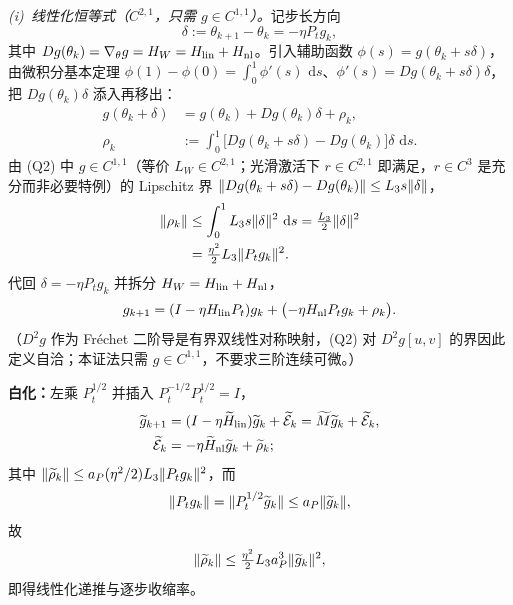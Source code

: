 \documentclass[fontset=windows,11pt]{ctexart}
\DeclarePairedDelimiter{\norm}{\lVert}{\rVert}
\newcommand{\W}{W}
\newcommand{\Erem}{\mathcal E}
\newcommand{\wt}[1]{\widetilde{#1}}
\newcommand{\dd}{\,\mathrm d}
\numberwithin{equation}{section}
\begin{document}
\medskip
\emph{(i)~线性化恒等式（$C^{2,1}$，只需 $g\in C^{1,1}$）。}记步长方向
\begin{equation}
\delta:=\theta_{k+1}-\theta_k=-\eta P_tg_k,
\end{equation}
其中 $Dg(\theta_k)=\nabla_\theta g=H_{\W}=H_{\rm lin}+H_{\rm nl}$。引入辅助函数 $\phi(s)=g(\theta_k+s\delta)$，由微积分基本定理 $\phi(1)-\phi(0)=\int_0^1\phi'(s)\,\dd s$、$\phi'(s)=Dg(\theta_k+s\delta)\delta$，把 $Dg(\theta_k)\delta$ 添入再移出：
\begin{align}
g(\theta_k+\delta)&=g(\theta_k)+Dg(\theta_k)\delta+\rho_k,\\
\rho_k&:=\int_0^1\bigl[Dg(\theta_k+s\delta)-Dg(\theta_k)\bigr]\delta\,\dd s.
\end{align}
由 (Q2) 中 $g\in C^{1,1}$（等价 $L_{\W}\in C^{2,1}$；光滑激活下 $r\in C^{2,1}$ 即满足，$r\in C^3$ 是充分而非必要特例）的 Lipschitz 界 $\norm{Dg(\theta_k+s\delta)-Dg(\theta_k)}\le L_3s\norm\delta$，
\begin{align}
\norm{\rho_k}
&\le\int_0^1 L_3s\norm\delta^2\,\dd s=\tfrac{L_3}{2}\norm\delta^2\notag\\
&=\tfrac{\eta^2}{2}L_3\norm{P_tg_k}^2.
\end{align}
代回 $\delta=-\eta P_tg_k$ 并拆分 $H_{\W}=H_{\rm lin}+H_{\rm nl}$，
\begin{equation}
g_{k+1}=(I-\eta H_{\rm lin}P_t)g_k+\bigl(-\eta H_{\rm nl}P_tg_k+\rho_k\bigr).
\end{equation}
（$D^2g$ 作为 Fr\'echet 二阶导是有界双线性对称映射，(Q2) 对 $D^2g[u,v]$ 的界因此定义自洽；本证法只需 $g\in C^{1,1}$，不要求三阶连续可微。）

\noindent\textbf{白化：}左乘 $P_t^{1/2}$ 并插入 $P_t^{-1/2}P_t^{1/2}=I$，
\begin{align}
\wt g_{k+1}&=(I-\eta\wt H_{\rm lin})\wt g_k+\wt\Erem_k=\wt M\wt g_k+\wt\Erem_k,\\
\wt\Erem_k&=-\eta\wt H_{\rm nl}\wt g_k+\wt\rho_k;
\end{align}
其中 $\norm{\wt\rho_k}\le a_P(\eta^2/2)L_3\norm{P_tg_k}^2$，而
\begin{equation}
\norm{P_tg_k}=\norm{P_t^{1/2}\wt g_k}\le a_P\norm{\wt g_k},
\end{equation}
故
\begin{equation}
\norm{\wt\rho_k}\le\tfrac{\eta^2}{2}L_3a_P^3\norm{\wt g_k}^2,
\end{equation}
即得线性化递推与逐步收缩率。
\end{document}

